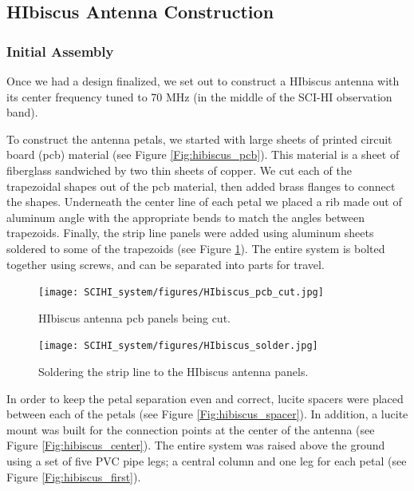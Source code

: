 \subsection{HIbiscus Antenna Construction}

\subsubsection{Initial Assembly}
Once we had a design finalized, we set out to construct a HIbiscus antenna with its center frequency tuned to 70 MHz (in the middle of the SCI-HI observation band).

To construct the antenna petals, we started with large sheets of printed circuit board (pcb) material (see Figure \ref{Fig:hibiscus_pcb}). This material is a sheet of fiberglass sandwiched by two thin sheets of copper. We cut each of the trapezoidal shapes out of the pcb material, then added brass flanges to connect the shapes. Underneath the center line of each petal we placed a rib made out of aluminum angle with the appropriate bends to match the angles between trapezoids. Finally, the strip line panels were added using aluminum sheets soldered to some of the trapezoids (see Figure \ref{Fig:hibiscus_solder}). The entire system is bolted together using screws, and can be separated into parts for travel. 

\begin{figure}[htb]
\centering
\begin{minipage}[b]{0.39\textwidth}
\centering
\texttt{[image: SCIHI\_system/figures/HIbiscus\_pcb\_cut.jpg]}
\caption{HIbiscus antenna pcb panels being cut. }
\label{Fig:hibiscus_pcb}
\end{minipage}%
\begin{minipage}[b]{0.02\textwidth}
\hspace{1cm}
\end{minipage}%
\begin{minipage}[b]{0.55\textwidth}
\centering
\texttt{[image: SCIHI\_system/figures/HIbiscus\_solder.jpg]}
\caption{Soldering the strip line to the HIbiscus antenna panels.}
\label{Fig:hibiscus_solder}
\end{minipage}
\end{figure} 

In order to keep the petal separation even and correct, lucite spacers were placed between each of the petals (see Figure \ref{Fig:hibiscus_spacer}). In addition, a lucite mount was built for the connection points at the center of the antenna (see Figure \ref{Fig:hibiscus_center}). The entire system was raised above the ground using a set of five PVC pipe legs; a central column and one leg for each petal (see Figure \ref{Fig:hibiscus_first}). 

